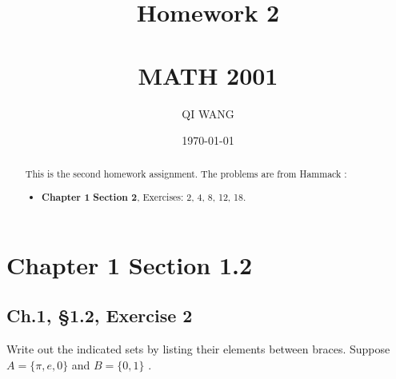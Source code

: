 \documentclass[12pt]{amsart}
\numberwithin{equation}{section}
\theoremstyle{definition}
\theoremstyle{remark}
\begin{document}




\author[QI]{QI WANG}
\address{University of Colorado, Department of Mathematics,  Campus Box 395,
Boulder, CO 80309-0395}
\date{\today}



\title[Homework 2]{Homework 2 \\ \ \\  MATH 2001}

\begin{abstract} 
This is the second homework assignment.  The problems are from Hammack \cite[Ch.~1, \S 1.2]{H13}:
\begin{itemize}

\item \textbf{Chapter 1}  
\textbf{Section 2}, Exercises:  2, 4, 8, 12, 18.

\end{itemize}
\end{abstract}


\maketitle


\tableofcontents





\section*{Chapter 1 Section 1.2}



\subsection*{Ch.1, \S 1.2,  Exercise 2} Write out the indicated sets by listing their elements between braces. Suppose $A = \{\pi , e, 0\}$ and $B = \{0, 1\}$ .
\end{document}
